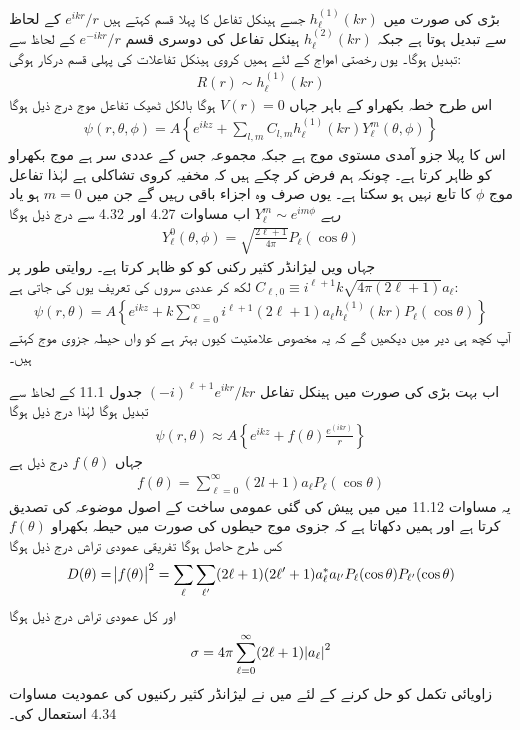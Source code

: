 بڑی  کی صورت میں \(h_{\ell}^{(1)}(kr)\) جسے ہینکل تفاعل  کا پہلا قسم کہتے ہیں \(e^{ikr}/r\) کے لحاظ سے تبدیل ہوتا ہے جبکہ \(h_{\ell}^{(2)}(kr)\) ہینکل تفاعل کی دوسری قسم \(e^{-ikr}/r\) کے لحاظ سے تبدیل ہوگا۔ یوں رخصتی امواج کے لئے ہمیں کروی ہینکل تفاعلات کی پہلی قسم درکار ہوگی:
\begin{align}
	R(r)\sim h^{(1)}_{\ell}(kr)
\end{align}
اس طرح خطہ بکھراو کے باہر جہاں \(V(r) = 0\) ہوگا بالکل  ٹھیک تفاعل موج درج ذیل ہوگا
\begin{align}
	\psi(r, \theta, \phi) = A\left\{e^{ikz}+\sum_{l, m}C_{l, m}h^{(1)}_{\ell}(kr)Y^m_{\ell}(\theta, \phi)\right\}
\end{align}
اس کا پہلا جزو آمدی مستوی موج ہے جبکہ مجموعہ جس کے عددی سر  ہے موج بکھراو کو ظاہر کرتا ہے۔ چونکہ ہم فرض کر چکے ہیں کہ مخفیہ کروی تشاکلی ہے لہٰذا تفاعل موج \(\phi\) کا تابع نہیں ہو سکتا ہے۔ یوں صرف وہ اجزاء باقی رہیں گے جن میں \(m=0\) ہو یاد رہے \(Y_{\ell}^m\sim e^{im\phi}\) اب مساوات \num{4.27} اور \num{4.32} سے درج ذیل ہوگا
\begin{align}
	Y^0_{\ell}(\theta, \phi) = \sqrt{\frac{2\ell+1}{4\pi}}P_{\ell}(\cos\theta)
\end{align}
جہاں  ویں لیژانڈر کثیر رکنی کو  کو ظاہر کرتا ہے۔ روایتی طور پر \(C_{\ell, 0}\equiv i^{\ell+1}k\sqrt{4\pi(2\ell+1)}a_{\ell}\) لکھ کر عددی سروں کی تعریف یوں کی جاتی ہے:
\begin{align}
	\psi(r, \theta) = A\left\{e^{ikz}+k\sum_{\ell=0}^{\infty}i^{\ell+1}(2\ell+1)a_{\ell}h_{\ell}^{(1)}(kr)P_{\ell}(\cos\theta)\right\}
\end{align}
آپ کچھ ہی دیر میں دیکھیں گے کہ یہ مخصوص علامتیت کیوں بہتر ہے  کو  واں حیطہ جزوی موج کہتے ہیں۔

اب بہت بڑی  کی صورت میں ہینکل تفاعل \((-i)^{\ell+1}e^{ikr}/kr\) جدول \num{11.1} کے لحاظ سے تبدیل ہوگا لہٰذا درج ذیل ہوگا 
\begin{align}
	\psi(r, \theta)\approx A\left\{e^{ikz}+f(\theta)\frac{e^{(ikr)}}{r}\right\}
\end{align}
جہاں \(f(\theta)\) درج ذیل ہے
\begin{align}
	f(\theta) = \sum_{\ell=0}^{\infty}(2l+1)a_{\ell}P_{\ell}(\cos\theta)
\end{align}
یہ مساوات \num{11.12} میں میں پیش کی گئی عمومی ساخت کے اصول موضوعہ کی تصدیق کرتا ہے اور ہمیں دکھاتا ہے کہ جزوی موج حیطوں  کی صورت میں حیطہ بکھراو \(f(\theta)\) کس طرح حاصل ہوگا تفریقی عمودی تراش درج ذیل ہوگا
\begin{align}
	D(\theta) = \abs{f(\theta)}^2 = \sum_{\ell}\sum_{\ell^\prime}(2\ell+1)(2\ell^\prime+1)a^*_{\ell}a_{l^\prime}P_{\ell}(\cos\theta)P_{\ell^\prime}(\cos\theta)
\end{align}
اور کل عمودی تراش درج ذیل ہوگا
\begin{align}
	\sigma=4\pi\sum_{\ell=0}^{\infty}(2\ell+1)\abs{a_{\ell}}^2
\end{align}
زاویائی تکمل کو حل کرنے کے لئے میں نے لیژانڈر کثیر رکنیوں کی عمودیت مساوات \num{4.34} استعمال کی۔

